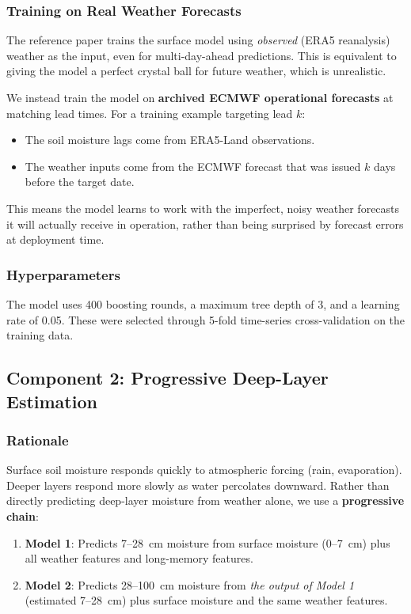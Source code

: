 \documentclass[12pt, a4paper]{article}
\begin{document}
\subsubsection{Training on Real Weather Forecasts}

The reference paper trains the surface model using \textit{observed} (ERA5 reanalysis) weather as the input, even for multi-day-ahead predictions. This is equivalent to giving the model a perfect crystal ball for future weather, which is unrealistic.

We instead train the model on \textbf{archived ECMWF operational forecasts} at matching lead times. For a training example targeting lead $k$:
\begin{itemize}
    \item The soil moisture lags come from ERA5-Land observations.
    \item The weather inputs come from the ECMWF forecast that was issued $k$ days before the target date.
\end{itemize}

This means the model learns to work with the imperfect, noisy weather forecasts it will actually receive in operation, rather than being surprised by forecast errors at deployment time.

\subsubsection{Hyperparameters}

The model uses 400 boosting rounds, a maximum tree depth of 3, and a learning rate of 0.05. These were selected through 5-fold time-series cross-validation on the training data.

\subsection{Component 2: Progressive Deep-Layer Estimation}

\subsubsection{Rationale}

Surface soil moisture responds quickly to atmospheric forcing (rain, evaporation). Deeper layers respond more slowly as water percolates downward. Rather than directly predicting deep-layer moisture from weather alone, we use a \textbf{progressive chain}:

\begin{enumerate}
    \item \textbf{Model 1}: Predicts 7--28~cm moisture from surface moisture (0--7~cm) plus all weather features and long-memory features.
    \item \textbf{Model 2}: Predicts 28--100~cm moisture from \textit{the output of Model 1} (estimated 7--28~cm) plus surface moisture and the same weather features.
\end{enumerate}
\end{document}
